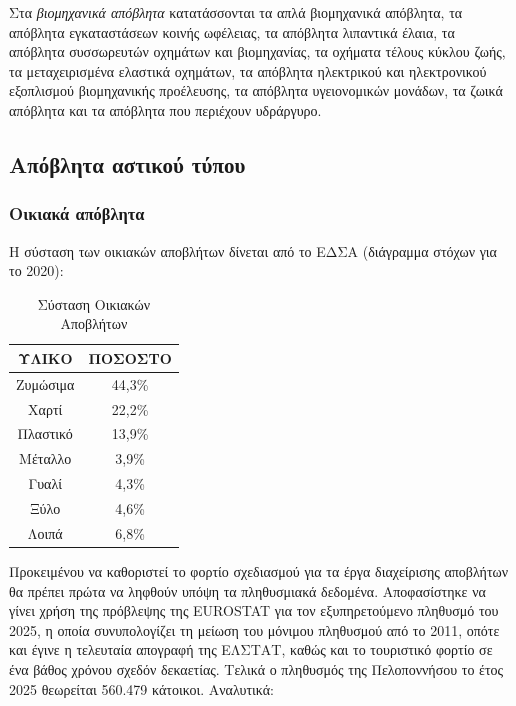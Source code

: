 \documentclass[12pt]{article}
\newcommand{\gr}{\selectlanguage{greek}}
\newcommand{\eng}{\selectlanguage{english}}
\begin{document}
	Στα \emph{βιομηχανικά απόβλητα} κατατάσσονται τα απλά βιομηχανικά απόβλητα, τα απόβλητα εγκαταστάσεων κοινής ωφέλειας, τα απόβλητα λιπαντικά έλαια, τα απόβλητα συσσωρευτών οχημάτων και βιομηχανίας, τα οχήματα τέλους κύκλου ζωής, τα μεταχειρισμένα ελαστικά οχημάτων, τα απόβλητα ηλεκτρικού και ηλεκτρονικού εξοπλισμού βιομηχανικής προέλευσης, τα απόβλητα υγειονομικών μονάδων, τα ζωικά απόβλητα και τα απόβλητα που περιέχουν υδράργυρο.
	
	\subsection{Απόβλητα αστικού τύπου}
	
	\subsubsection{Οικιακά απόβλητα}
	
	Η σύσταση των οικιακών αποβλήτων δίνεται από το ΕΔΣΑ (διάγραμμα στόχων για το 2020):
	
	\begin{table}[H]
		\centering
		\begin{tabular}{|c||c|}
			\hline
			\textbf{ΥΛΙΚΟ} & \textbf{ΠΟΣΟΣΤΟ} \\ \hline
			Ζυμώσιμα & 44,3\% \\ \hline
			Χαρτί & 22,2\% \\ \hline
			Πλαστικό & 13,9\% \\ \hline
			Μέταλλο & 3,9\% \\ \hline
			Γυαλί & 4,3\% \\ \hline
			Ξύλο & 4,6\% \\ \hline
			Λοιπά & 6,8\% \\ \hline
		\end{tabular}
		\caption{Σύσταση Οικιακών Αποβλήτων}
		\label{The label}
	\end{table}
	
	Προκειμένου να καθοριστεί το φορτίο σχεδιασμού για τα έργα διαχείρισης αποβλήτων θα πρέπει πρώτα να ληφθούν υπόψη τα πληθυσμιακά δεδομένα. Αποφασίστηκε να γίνει χρήση της πρόβλεψης της \eng EUROSTAT \gr για τον εξυπηρετούμενο πληθυσμό του 2025, η οποία συνυπολογίζει τη μείωση του μόνιμου πληθυσμού από το 2011, οπότε και έγινε η τελευταία απογραφή της ΕΛΣΤΑΤ, καθώς και το τουριστικό φορτίο σε ένα βάθος χρόνου σχεδόν δεκαετίας. Τελικά ο πληθυσμός της Πελοποννήσου το έτος 2025 θεωρείται 560.479 κάτοικοι. Αναλυτικά:
	
\end{document}
